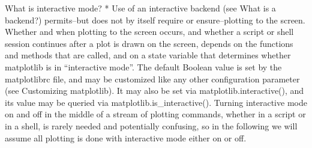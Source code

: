 \documentclass{article}
\begin{document}
What is interactive mode? * Use of an interactive backend (see What is a
backend?) permits--but does not by itself require or ensure--plotting to
the screen. Whether and when plotting to the screen occurs, and whether
a script or shell session continues after a plot is drawn on the screen,
depends on the functions and methods that are called, and on a state
variable that determines whether matplotlib is in ``interactive mode''.
The default Boolean value is set by the matplotlibrc file, and may be
customized like any other configuration parameter (see Customizing
matplotlib). It may also be set via matplotlib.interactive(), and its
value may be queried via matplotlib.is\_interactive(). Turning
interactive mode on and off in the middle of a stream of plotting
commands, whether in a script or in a shell, is rarely needed and
potentially confusing, so in the following we will assume all plotting
is done with interactive mode either on or off.
\end{document}
